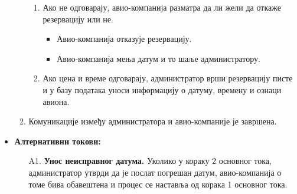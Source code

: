 \documentclass{article}
\begin{document}
\begin{itemize}
\begin{enumerate}
                 \begin{enumerate}
                    \item Ако не одговарају, авио-компанија разматра да ли жели да откаже резервацију или не. 
                        \begin{itemize}
                            \item Авио-компанија отказује резервацију.
                            \item Авио-компанија мења датум и то шаље администратору.
                        \end{itemize}
                    \item Ако цена и време одговарају, администратор врши резервацију писте и у базу података уноси информацију о датуму, времену и ознаци авиона.
                \end{enumerate}
        \item Комуникације између администратора и авио-компаније је завршена.
    \end{enumerate}
    \item \textbf{Алтернативни токови:}
        \begin{itemize}
            \item[A1.] \textbf{Унос неисправног датума.} Уколико у кораку 2 основног тока, администратор утврди да је послат погрешан датум, авио-компанија о томе бива обавештена и процес се наставља од корака 1 основног тока.
        \end{itemize}
\end{itemize}
\end{document}

